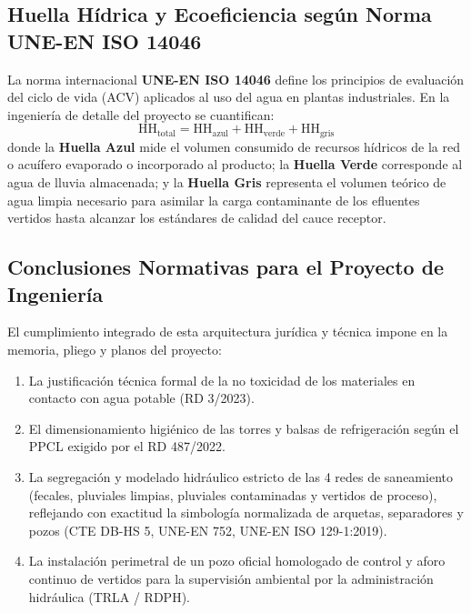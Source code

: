 \documentclass{report}
\begin{document}
\subsection{Huella Hídrica y Ecoeficiencia según Norma UNE-EN ISO 14046}
La norma internacional \textbf{UNE-EN ISO 14046} define los principios de evaluación del ciclo de vida (ACV) aplicados al uso del agua en plantas industriales. En la ingeniería de detalle del proyecto se cuantifican:
\begin{equation}
    \text{HH}_{\text{total}} = \text{HH}_{\text{azul}} + \text{HH}_{\text{verde}} + \text{HH}_{\text{gris}}
\end{equation}
donde la \textbf{Huella Azul} mide el volumen consumido de recursos hídricos de la red o acuífero evaporado o incorporado al producto; la \textbf{Huella Verde} corresponde al agua de lluvia almacenada; y la \textbf{Huella Gris} representa el volumen teórico de agua limpia necesario para asimilar la carga contaminante de los efluentes vertidos hasta alcanzar los estándares de calidad del cauce receptor.

\subsection{Conclusiones Normativas para el Proyecto de Ingeniería}
El cumplimiento integrado de esta arquitectura jurídica y técnica impone en la memoria, pliego y planos del proyecto:
\begin{enumerate}
    \item La justificación técnica formal de la no toxicidad de los materiales en contacto con agua potable (RD 3/2023).
    \item El dimensionamiento higiénico de las torres y balsas de refrigeración según el PPCL exigido por el RD 487/2022.
    \item La segregación y modelado hidráulico estricto de las 4 redes de saneamiento (fecales, pluviales limpias, pluviales contaminadas y vertidos de proceso), reflejando con exactitud la simbología normalizada de arquetas, separadores y pozos (CTE DB-HS 5, UNE-EN 752, UNE-EN ISO 129-1:2019).
    \item La instalación perimetral de un pozo oficial homologado de control y aforo continuo de vertidos para la supervisión ambiental por la administración hidráulica (TRLA / RDPH).
\end{enumerate}


%
\end{document}
